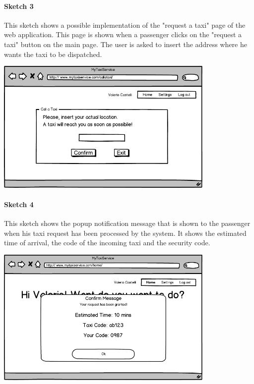 \paragraph{Sketch 3}
This sketch shows a possible implementation of the "request a taxi" page of the web application. This page is shown when a passenger clicks on the "request a taxi" button on the main page. The user is asked to insert the address where he wants the taxi to be dispatched.
\begin{center}
\includegraphics[width=300pt,keepaspectratio]{images/user_call.png}
\end{center}


\paragraph{Sketch 4}
This sketch shows the popup notification message that is shown to the passenger when his taxi request has been processed by the system. It shows the estimated time of arrival, the code of the incoming taxi and the security code.
\begin{center}
\includegraphics[width=300pt,keepaspectratio]{images/user_confirm.png}
\end{center}


